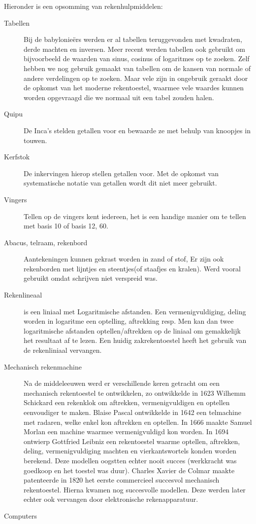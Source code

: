 \documentclass[../main.tex]{subfiles}
\begin{document}
\begin{solution}
Hieronder is een opsomming van rekenhulpmiddelen:
	\begin{description}
		\item[Tabellen] Bij de babylonie\"ers werden er al tabellen teruggevonden met kwadraten, derde machten en inversen. Meer recent werden tabellen ook gebruikt om bijvoorbeeld de waarden van sinus, cosinus of logaritmes op te zoeken.
		Zelf hebben we nog gebruik gemaakt van tabellen om de kansen van normale of andere verdelingen op te zoeken. Maar vele zijn in ongebruik geraakt door de opkomst van het moderne rekentoestel, waarmee vele waardes kunnen worden opgevraagd die we normaal uit een tabel zouden halen.
		\item[Quipu] De Inca's stelden getallen voor en bewaarde ze met behulp van knoopjes in touwen.
		\item[Kerfstok] De inkervingen hierop stellen getallen voor. Met de opkomst van systematische notatie van getallen wordt dit niet meer gebruikt.
		\item[Vingers] Tellen op de vingers kent iedereen, het is een handige manier om te tellen met basis 10 of basis 12, 60. 
		\item[Abacus, telraam, rekenbord] Aantekeningen kunnen gekrast worden in zand of stof, Er zijn ook rekenborden met lijntjes en steentjes(of staafjes en kralen). Werd vooral gebruikt omdat schrijven niet verspreid was.
		\item[Rekenlineaal] is een liniaal met Logaritmische afstanden. Een vermenigvuldiging, deling worden in logaritme een optelling, aftrekking resp. Men kan dan twee logaritmische afstanden optellen/aftrekken op de liniaal om gemakkelijk het resultaat af te lezen. Een huidig zakrekentoestel heeft het gebruik van de rekenliniaal vervangen.
		\item[Mechanisch rekenmachine] Na de middeleeuwen werd er verschillende keren getracht om een mechanisch rekentoestel te ontwikkelen, zo ontwikkelde in 1623 Wilhemm Schickard een rekenklok om aftrekken, vermenigvuldigen en optellen eenvoudiger te maken. Blaise Pascal ontwikkelde in 1642 een telmachine met radaren, welke enkel kon aftrekken en optellen. In 1666 maakte Samuel Morlan een machine waarmee vermenigvuldigd kon worden. In 1694 ontwierp Gottfried Leibniz een rekentoestel waarme optellen, aftrekken, deling, vermenigvuldiging machten en vierkantswortels konden worden berekend. Deze modellen oogstten echter nooit succes (werkkracht was goedkoop en het toestel was duur). Charles Xavier de Colmar maakte patenteerde in 1820 het eerste commercieel succesvol mechanisch rekentoestel. Hierna kwamen nog succesvolle modellen. Deze werden later echter ook vervangen door elektronische rekenapparatuur.
		\item[Computers]

	\end{description}
\end{solution}
\end{document}
